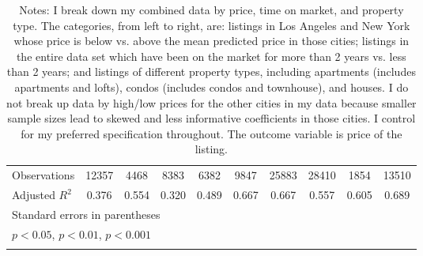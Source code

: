 \begin{sidewaystable}
{\begin{longtable}{l*{9}{c}}
\hline
Observations        &       12357         &        4468         &        8383         &        6382         &        9847         &       25883         &       28410         &        1854         &       13510         \\
Adjusted \(R^{2}\)  &       0.376         &       0.554         &       0.320         &       0.489         &       0.667         &       0.667         &       0.557         &       0.605         &       0.689         \\
\hline\hline
\multicolumn{10}{l}{\footnotesize Standard errors in parentheses}\\
\multicolumn{10}{l}{\footnotesize \sym{*} \(p<0.05\), \sym{**} \(p<0.01\), \sym{***} \(p<0.001\)}\\
\caption*{Notes: I break down my combined data by price, time on market, and property type. The categories, from left to right, are: listings in Los Angeles and New York whose price is below vs. above the mean predicted price in those cities; listings in the entire data set which have been on the market for more than 2 years vs. less than 2 years; and listings of different property types, including apartments (includes apartments and lofts), condos (includes condos and townhouse), and houses. I do not break up data by high/low prices for the other cities in my data because smaller sample sizes lead to skewed and less informative coefficients in those cities. I control for my preferred specification throughout. The outcome variable is price of the listing.}\\
\end{longtable}
}
\end{sidewaystable}

